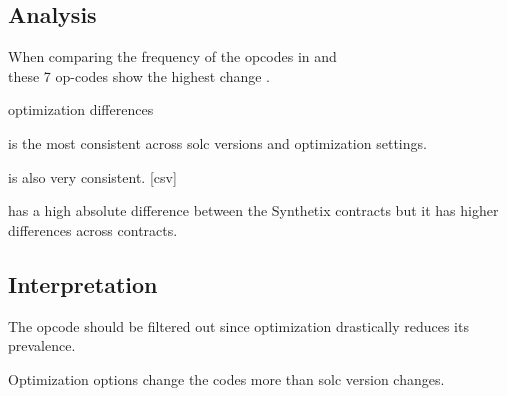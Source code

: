 \documentclass[../main.tex]{subfiles}
\begin{document}
\subsection{Analysis}
When comparing the frequency of the opcodes in  and\\
 these 7 op-codes show the highest change .

\begin{table}[ht!]
  \centering
  \caption{optimization differences}
  \label{tbl:opt_diff}
\end{table}

 is the most consistent across solc versions and optimization settings.

 is also very consistent. [csv]

 has a high absolute difference between the Synthetix contracts but it has higher differences across contracts.

\subsection{Interpretation}
The  opcode should be filtered out since optimization drastically reduces its prevalence.

Optimization options change the codes more than solc version changes.
\end{document}
